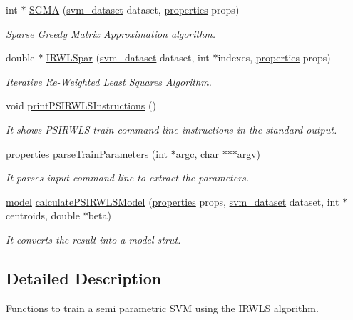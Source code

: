 \begin{DoxyCompactItemize}
\item 
int $\ast$ \hyperlink{PSIRWLS-train_8h_a50a6e1f36a010feb91db9b9b38679948}{S\+G\+MA} (\hyperlink{structsvm__dataset}{svm\+\_\+dataset} dataset, \hyperlink{structproperties}{properties} props)
\begin{DoxyCompactList}\small\item\em Sparse Greedy Matrix Approximation algorithm. \end{DoxyCompactList}\item 
double $\ast$ \hyperlink{PSIRWLS-train_8h_ad51d9a46645ad0b0bedb1113a3807d24}{I\+R\+W\+L\+Spar} (\hyperlink{structsvm__dataset}{svm\+\_\+dataset} dataset, int $\ast$indexes, \hyperlink{structproperties}{properties} props)
\begin{DoxyCompactList}\small\item\em Iterative Re-\/\+Weighted Least Squares Algorithm. \end{DoxyCompactList}\item 
void \hyperlink{PSIRWLS-train_8h_af71e97e89750872ce608bffd01d2af41}{print\+P\+S\+I\+R\+W\+L\+S\+Instructions} ()
\begin{DoxyCompactList}\small\item\em It shows P\+S\+I\+R\+W\+L\+S-\/train command line instructions in the standard output. \end{DoxyCompactList}\item 
\hyperlink{structproperties}{properties} \hyperlink{PSIRWLS-train_8h_a67566f6fd6aec7278ca360186af4e91b}{parse\+Train\+Parameters} (int $\ast$argc, char $\ast$$\ast$$\ast$argv)
\begin{DoxyCompactList}\small\item\em It parses input command line to extract the parameters. \end{DoxyCompactList}\item 
\hyperlink{structmodel}{model} \hyperlink{PSIRWLS-train_8h_a71b4329438bbf3210414315619f7b804}{calculate\+P\+S\+I\+R\+W\+L\+S\+Model} (\hyperlink{structproperties}{properties} props, \hyperlink{structsvm__dataset}{svm\+\_\+dataset} dataset, int $\ast$centroids, double $\ast$beta)
\begin{DoxyCompactList}\small\item\em It converts the result into a model strut. \end{DoxyCompactList}\end{DoxyCompactItemize}


\subsection{Detailed Description}
Functions to train a semi parametric S\+VM using the I\+R\+W\+LS algorithm. 

